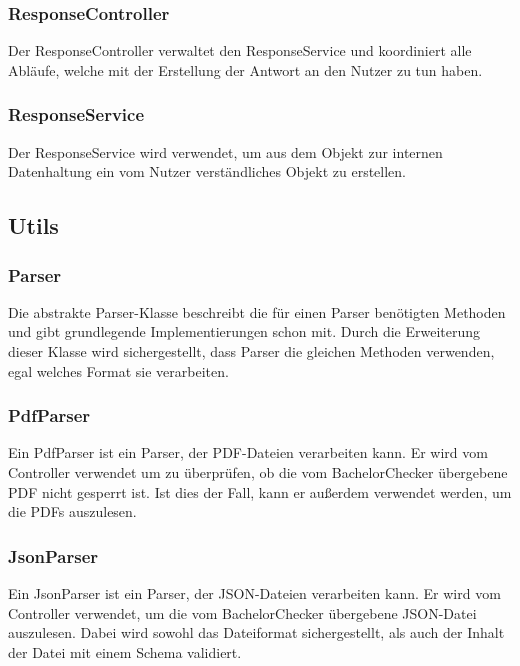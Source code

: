 \subsubsection{ResponseController}\label{subsubsec:response_controller}
Der ResponseController verwaltet den ResponseService und koordiniert alle Abläufe,
welche mit der Erstellung der Antwort an den Nutzer zu tun haben.

\subsubsection{ResponseService}\label{subsubsec:response_service}
Der ResponseService wird verwendet, um aus dem Objekt zur internen Datenhaltung ein vom Nutzer verständliches Objekt zu erstellen.

\subsection{Utils}\label{subsec:utils}

\subsubsection{Parser}\label{subsubsec:parser}
Die abstrakte Parser-Klasse beschreibt die für einen Parser benötigten Methoden und gibt grundlegende Implementierungen schon mit.
Durch die Erweiterung dieser Klasse wird sichergestellt,
dass Parser die gleichen Methoden verwenden, egal welches Format sie verarbeiten.

\subsubsection{PdfParser}\label{subsubsec:pdf_parser}
Ein PdfParser ist ein Parser, der PDF-Dateien verarbeiten kann.
Er wird vom Controller verwendet um zu überprüfen, ob die vom BachelorChecker übergebene PDF nicht gesperrt ist.
Ist dies der Fall, kann er außerdem verwendet werden, um die PDFs auszulesen.

\subsubsection{JsonParser}\label{subsubsec:json_parser}
Ein JsonParser ist ein Parser, der JSON-Dateien verarbeiten kann.
Er wird vom Controller verwendet, um die vom BachelorChecker übergebene JSON-Datei auszulesen.
Dabei wird sowohl das Dateiformat sichergestellt, als auch der Inhalt der Datei mit einem Schema validiert.